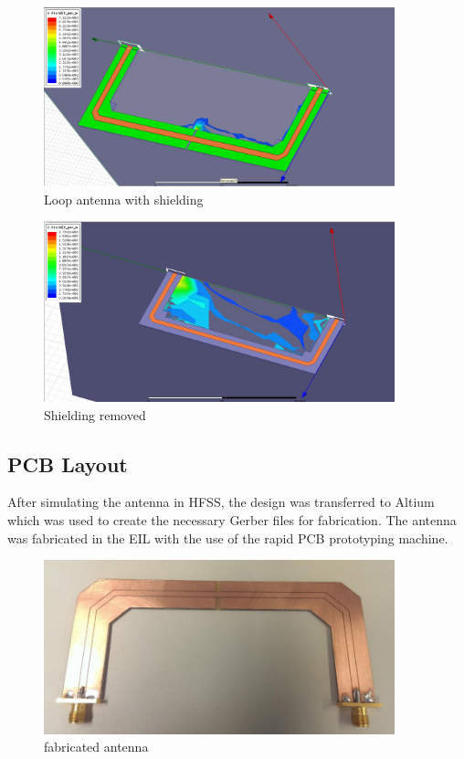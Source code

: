 \begin{figure}[h]
	\begin{center}
		\includegraphics[width=4in]{./images/Figure6.jpg}
		\caption{Loop antenna with shielding}
		\label{fig:hfield_fig6}
	\end{center}
\end{figure}

\begin{figure}[h]
	\begin{center}
		\includegraphics[width=4in]{./images/Figure7.jpg}
		\caption{Shielding removed}
		\label{fig:hfield_fig7}
	\end{center}
\end{figure}

\subsection{PCB Layout}

After simulating the antenna in HFSS, the design was transferred to Altium which was used to create the necessary Gerber files for fabrication. The antenna was fabricated in the EIL with the use of the rapid PCB prototyping machine.

\begin{figure}[h]
	\begin{center}
		\includegraphics[width=4in]{./images/Figure8.jpg}
		\caption{fabricated antenna}
		\label{fig:hfield_fig8}
	\end{center}
\end{figure}

